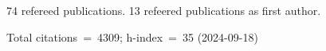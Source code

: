 74 refereed publications. 13 refeered publications as first author.

Total citations~=~4309; h-index~=~35 (2024-09-18)